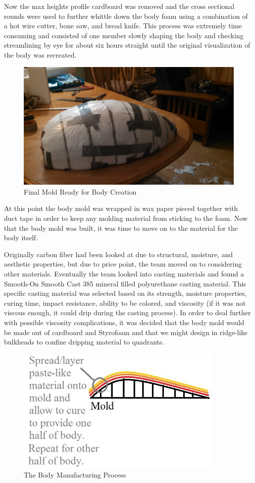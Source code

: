 \documentclass{report}
\begin{document}
Now the max heights profile cardboard was removed and the cross sectional rounds were used to further whittle down the body foam  using a combination of a hot wire cutter, bone saw, and bread knife.  This process was extremely time consuming and consisted of one member slowly shaping the body and checking streamlining by eye for about six hours straight until the original visualization of the body was recreated.
\begin{figure}[H]
\centering
\includegraphics[width=12cm]{wrappedfoam}
\caption{Final Mold Ready for Body Creation}
\end{figure}
At this point the body mold was wrapped in wax paper pieced together with duct tape in order to keep any molding material from sticking to the foam.  Now that the body mold was built, it was time to move on to the material for the body itself.\par
Originally carbon fiber had been looked at due to structural, moisture, and aesthetic properties, but due to price point, the team moved on to considering other materials.  Eventually the team looked into casting materials and found a Smooth-On Smooth Cast 385 mineral filled polyurethane casting material.  This specific casting material was selected based on its strength, moisture properties, curing time, impact resistance, ability to be colored, and viscosity (if it was not viscous enough, it could drip during the casting process).  In order to deal further with possible viscosity complications, it was decided that the body mold would be made out of cardboard and Styrofoam and that we might design in ridge-like bulkheads to confine dripping material to quadrants.
\begin{figure}[H]
\centering
\includegraphics[width=10cm]{fglass}
\caption{The Body Manufacturing Process}
\end{figure}
\end{document}
